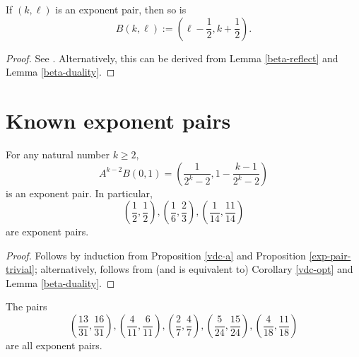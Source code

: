 \begin{proposition}\label{vdc-b}
\leanok
If $(k,\ell)$ is an exponent pair, then so is
    $$B(k,\ell) := \left(\ell-\frac{1}{2}, k+\frac{1}{2}\right).$$
\end{proposition}

\literature
{}

\begin{proof}\leanok See \cite[Lemma 2.9]{ivic}.  Alternatively, this can be derived from Lemma \ref{beta-reflect} and Lemma \ref{beta-duality}.
\end{proof}


\section{Known exponent pairs}


\begin{proposition}\label{vdc-class} For any natural number $k \geq 2$,
    $$ A^{k-2} B(0,1) = \left( \frac{1}{2^k-2}, 1 - \frac{k-1}{2^k-2} \right)$$
    is an exponent pair.  In particular,
    $$ \left(\frac{1}{2}, \frac{1}{2}\right), \left(\frac{1}{6}, \frac{2}{3}\right), \left(\frac{1}{14}, \frac{11}{14}\right)$$
    are exponent pairs.
    \end{proposition}

    \begin{proof} Follows by induction from Proposition \ref{vdc-a} and Proposition \ref{exp-pair-trivial}; alternatively, follows from (and is equivalent to) Corollary \ref{vdc-opt} and Lemma \ref{beta-duality}.
    \end{proof}

\derived
{}

\begin{corollary}\label{add-exponential}  The pairs
$$ \left(\frac{13}{31}, \frac{16}{31}\right), \left(\frac{4}{11},\frac{6}{11}\right), \left(\frac{2}{7},\frac{4}{7}\right), \left(\frac{5}{24},\frac{15}{24}\right), \left(\frac{4}{18},\frac{11}{18}\right)$$
are all exponent pairs.
\end{corollary}

\derived
{}


